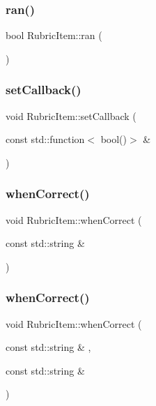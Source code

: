 \hypertarget{class_rubric_item_a96a9432a63552a832a9a8b3b422402e1}{}\label{class_rubric_item_a96a9432a63552a832a9a8b3b422402e1} 
\subsubsection{\texorpdfstring{ran()}{ran()}}
{\footnotesize\ttfamily bool Rubric\+Item\+::ran (\begin{DoxyParamCaption}{ }\end{DoxyParamCaption})}

\hypertarget{class_rubric_item_a29bf17ee6e15089b388cca8af88dfc4e}{}\label{class_rubric_item_a29bf17ee6e15089b388cca8af88dfc4e} 
\subsubsection{\texorpdfstring{set\+Callback()}{setCallback()}}
{\footnotesize\ttfamily void Rubric\+Item\+::set\+Callback (\begin{DoxyParamCaption}\item[{const std\+::function$<$ bool()$>$ \&}]{ }\end{DoxyParamCaption})}

\hypertarget{class_rubric_item_a7ab095215698e315f800bea2052f25ed}{}\label{class_rubric_item_a7ab095215698e315f800bea2052f25ed} 
\subsubsection{\texorpdfstring{when\+Correct()}{whenCorrect()}\hspace{0.1cm}{\footnotesize\ttfamily [1/2]}}
{\footnotesize\ttfamily void Rubric\+Item\+::when\+Correct (\begin{DoxyParamCaption}\item[{const std\+::string \&}]{ }\end{DoxyParamCaption})}

\hypertarget{class_rubric_item_a7b47b9d25ac196628033f95fda43a374}{}\label{class_rubric_item_a7b47b9d25ac196628033f95fda43a374} 
\subsubsection{\texorpdfstring{when\+Correct()}{whenCorrect()}\hspace{0.1cm}{\footnotesize\ttfamily [2/2]}}
{\footnotesize\ttfamily void Rubric\+Item\+::when\+Correct (\begin{DoxyParamCaption}\item[{const std\+::string \&}]{,  }\item[{const std\+::string \&}]{ }\end{DoxyParamCaption})}

